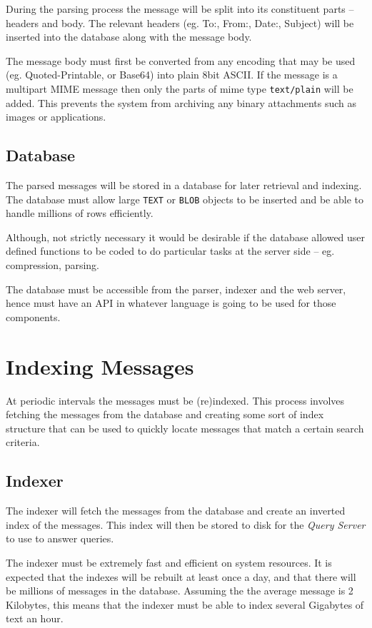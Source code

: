 During the parsing process the message will be split into its constituent
parts -- headers and body.  The relevant headers (eg. To:, From:, Date:,
Subject) will be inserted into the database along with the message body.

The message body must first be converted from any encoding that may be
used (eg. Quoted-Printable, or Base64) into plain 8bit ASCII.  If the
message is a multipart MIME message then only the parts of mime type
\texttt{text/plain} will be added.  This prevents the system from
archiving any binary attachments such as images or applications.

\subsection{Database}
The parsed messages will be stored in a database for later retrieval and
indexing.  The database must allow large \texttt{TEXT} or \texttt{BLOB}
objects to be inserted and be able to handle millions of rows efficiently.

Although, not strictly necessary it would be desirable if the database
allowed user defined functions to be coded to do particular tasks at the
server side -- eg. compression, parsing.

The database must be accessible from the parser, indexer and the web
server, hence must have an API in whatever language is going to be used
for those components.

\section{Indexing Messages}
At periodic intervals the messages must be (re)indexed.  This process
involves fetching the messages from the database and creating some sort of
index structure that can be used to quickly locate messages that match a
certain search criteria.

\subsection{Indexer}

The indexer will fetch the messages from the database and create an
inverted index of the messages.  This index will then be stored to disk
for the \emph{Query Server} to use to answer queries.

The indexer must be extremely fast and efficient on system resources.  It
is expected that the indexes will be rebuilt at least once a day, and that
there will be millions of messages in the database.  Assuming the the
average message is 2 Kilobytes, this means that the indexer must be able
to index several Gigabytes of text an hour.

